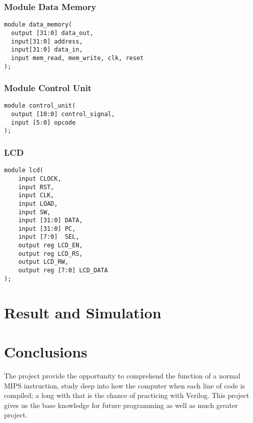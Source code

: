 \documentclass[12pt, a4paper, oneside]{article}
\begin{document}
     \subsubsection{Module Data Memory}
     \begin{lstlisting}
module data_memory(
  output [31:0] data_out,
  input[31:0] address,
  input[31:0] data_in,
  input mem_read, mem_write, clk, reset
);
     \end{lstlisting}
     
     \subsubsection{Module Control Unit}
     \begin{lstlisting}
module control_unit(
  output [10:0] control_signal,
  input [5:0] opcode
);
     \end{lstlisting}

     \subsubsection{LCD}
     \begin{lstlisting}
module lcd(
	input CLOCK,
	input RST,
	input CLK,
	input LOAD,
	input SW,
	input [31:0] DATA,
	input [31:0] PC,
	input [7:0]  SEL,
	output reg LCD_EN,
	output reg LCD_RS,
	output LCD_RW,
	output reg [7:0] LCD_DATA
);
     \end{lstlisting}
    \section{Result and Simulation}
    \section{Conclusions}
    \hspace{0.5cm}The project provide the opportunity to comprehend the function of a normal MIPS instruction, study deep into how the computer when each line of code is compiled; a long with that is the chance of practicing with Verilog. This project gives us the base knowledge for future programming as well as much greater project.
\end{document}
